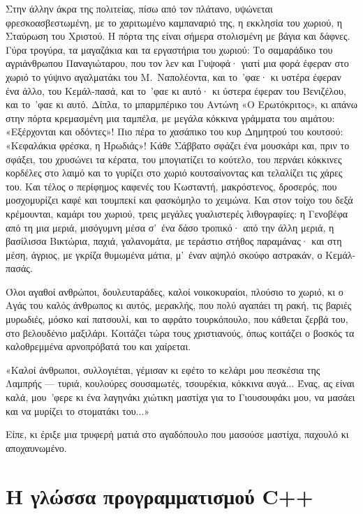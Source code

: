 \documentclass[diploma]{softlab-thesis}
\begin{document}
Στην άλλην άκρα της πολιτείας, πίσω από τον πλάτανο, υψώνεται
φρεσκοασβεστωμένη, με το χαριτωμένο καμπαναριό της, η εκκλησία του χωριού, η
Σταύρωση του Χριστού. Η πόρτα της είναι σήμερα στολισμένη με βάγια και
δάφνες. Γύρα τρογύρα, τα μαγαζάκια και τα εργαστήρια του χωριού: Το
σαμαράδικο του αγριάνθρωπου Παναγιώταρου, που τον λεν και Γυψοφά· γιατί μια
φορά έφεραν στο χωριό το γύψινο αγαλματάκι του Μ.~Ναπολέοντα, και το~’φαε·
κι υστέρα έφεραν ένα άλλο, του Κεμάλ-πασά, και το~’φαε κι αυτό· κι ύστερα
έφεραν του Βενιζέλου, και το~’φαε κι αυτό. Δίπλα, το μπαρμπέρικο του Αντώνη
«Ο Ερωτόκριτος», κι απάνω στην πόρτα κρεμασμένη μια ταμπέλα, με μεγάλα
κόκκινα γράμματα του αιμάτου: «Εξέρχονται και οδόντες»! Πιο πέρα το χασάπικο
του κυρ Δημητρού του κουτσού: «Κεφαλάκια φρέσκα, η Ηρωδιάς»! Κάθε Σάββατο
σφάζει ένα μουσκάρι και, πριν το σφάξει, του χρυσώνει τα κέρατα, του
μπογιατίζει το κούτελο, του περνάει κόκκινες κορδέλες στο λαιμό και το
γυρίζει στο χωριό κουτσαίνοντας και τελαλίζει τις χάρες του. Και τέλος ο
περίφημος καφενές του Κωσταντή, μακρόστενος, δροσερός, που μοσχομυρίζει καφέ
και τουμπεκί και φασκόμηλο το χειμώνα. Και στον τοίχο του δεξά κρέμουνται,
καμάρι του χωριού, τρεις μεγάλες γυαλιστερές λιθογραφίες: η Γενοβέφα από τη
μια μεριά, μισόγυμνη μέσα σ’~ένα δάσο τροπικό· από την άλλη μεριά, η
βασίλισσα Βικτώρια, παχιά, γαλανομάτα, με τεράστιο στήθος παραμάνας· και στη
μέση, άγριος, με γκρίζα θυμωμένα μάτια, μ’~έναν αψηλό σκούφο αστρακάν, ο
Κεμάλ-πασάς.

Όλοι αγαθοί ανθρώποι, δουλευταράδες, καλοί νοικοκυραίοι, πλούσιο το χωριό,
κι ο Αγάς του καλός άνθρωπος κι αυτός, μερακλής, που πολύ αγαπάει τη ρακή,
τις βαριές μυρωδιές, μόσκο καί πατσουλί, και το αφράτο τουρκόπουλο, που
κάθεται ζερβά του, στο βελουδένιο μαξιλάρι. Κοιτάζει τώρα τους χριστιανούς,
όπως κοιτάζει ο βοσκός τα καλοθρεμμένα αρνοπρόβατά του και χαίρεται.

«Καλοί άνθρωποι, συλλογιέται, γέμισαν κι εφέτο το κελάρι μου πεσκέσια της
Λαμπρής --- τυριά, κουλούρες σουσαμωτές, τσουρέκια, κόκκινα αυγά... Ένας, ας
είναι καλά, μου~’φερε κι ένα λαγηνάκι χιώτικη μαστίχα για το Γιουσουφάκι
μου, να μασάει και να μυρίζει το στοματάκι του...»

Είπε, κι έριξε μια τρυφερή ματιά στο αγαδόπουλο που μασούσε μαστίχα, παχουλό
κι αποχαυνωμένο.


\section{Η γλώσσα προγραμματισμού C++}
\end{document}
